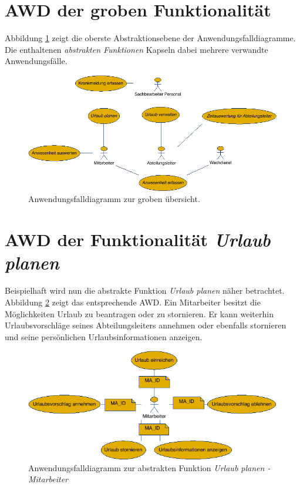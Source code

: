 \section{AWD der groben Funktionalität}
Abbildung \ref{AWD} zeigt die oberste Abstraktionsebene der Anwendungsfalldiagramme. Die enthaltenen \textit{abstrakten Funktionen} Kapseln dabei mehrere verwandte Anwendungsfälle.

\vspace{1cm}
\begin{figure}[hbp]
	\centering
	\includegraphics[width=\linewidth]{UML/Export/Grob.png}
	\caption{Anwendungsfalldiagramm zur groben übersicht.}
	\label{AWD}
\end{figure}

\newpage

\section{AWD der Funktionalität \textit{Urlaub planen}}
Beispielhaft wird nun die abstrakte Funktion \textit{Urlaub planen} näher betrachtet. Abbildung \ref{Urlaubplanen} zeigt das entsprechende AWD. Ein Mitarbeiter besitzt die Möglichkeiten Urlaub zu beantragen oder zu stornieren. Er kann weiterhin Urlaubsvorschläge seines Abteilungsleiters annehmen oder ebenfalls stornieren und seine persönlichen Urlaubsinformationen anzeigen.

\vspace{1cm}
\begin{figure}[hbp]
	\centering
	\includegraphics[width=\linewidth]{UML/Export/Urlaub_planen.png}
	\caption{Anwendungsfalldiagramm zur abstrakten Funktion \textit{Urlaub planen - Mitarbeiter}}
	\label{Urlaubplanen}
\end{figure}

